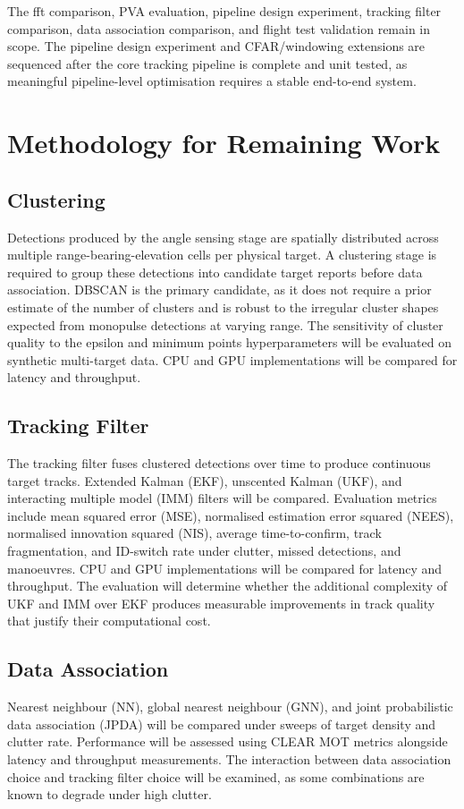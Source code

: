 The \gls{fft} comparison, PVA evaluation, pipeline design experiment, tracking filter 
comparison, data association comparison, and flight test validation remain in 
scope. The pipeline design experiment and CFAR/windowing extensions are sequenced 
after the core tracking pipeline is complete and unit tested, as meaningful 
pipeline-level optimisation requires a stable end-to-end system.

\section{Methodology for Remaining Work}
\subsection{Clustering}
Detections produced by the angle sensing stage are spatially distributed across 
multiple range-bearing-elevation cells per physical target. A clustering stage is 
required to group these detections into candidate target reports before data 
association. DBSCAN is the primary candidate, as it does not require a prior 
estimate of the number of clusters and is robust to the irregular cluster shapes 
expected from monopulse detections at varying range. The sensitivity of cluster 
quality to the epsilon and minimum points hyperparameters will be evaluated on 
synthetic multi-target data. CPU and GPU implementations will be compared for 
latency and throughput.
\subsection{Tracking Filter}
The tracking filter fuses clustered detections over time to produce continuous target 
tracks. Extended Kalman (EKF), unscented Kalman (UKF), and interacting multiple 
model (IMM) filters will be compared. Evaluation metrics include mean squared 
error (MSE), normalised estimation error squared (NEES), normalised innovation 
squared (NIS), average time-to-confirm, track fragmentation, and ID-switch rate 
under clutter, missed detections, and manoeuvres. CPU and GPU implementations 
will be compared for latency and throughput. The evaluation will determine 
whether the additional complexity of UKF and IMM over EKF produces measurable 
improvements in track quality that justify their computational cost.
\subsection{Data Association}
Nearest neighbour (NN), global nearest neighbour (GNN), and joint probabilistic data association (JPDA) will be compared under sweeps of target density and clutter rate. Performance will be assessed using CLEAR MOT metrics alongside latency and throughput measurements. The interaction between data association choice and tracking filter choice will be examined, as some combinations are known to degrade under high clutter.
